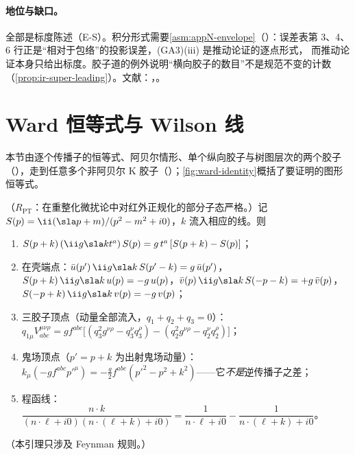 \paragraph{地位与缺口。}全部是标度陈述（E-S）。积分形式需要\cref{asm:appN-envelope}（\tagA）：误差表第 3、4、6 行正是“相对于包络”的投影误差，(GA3)(iii) 是推动论证的逐点形式，
而推动论证本身只给出标度。胶子道的例外说明“横向胶子的数目”不是规范不变的计数（\cref{prop:ir-super-leading}）。文献：\cite[第~11.3~节]{Collins2011}，\cite[第~8~节]{CollinsSoperSterman1989}。

\section{Ward 恒等式与 Wilson 线}\label{sec:method-ward}

本节由逐个传播子的恒等式、阿贝尔情形、单个纵向胶子与树图层次的两个胶子（\tagR），走到任意多个非阿贝尔 K 胶子（\tagA）；\cref{fig:ward-identity}概括了要证明的图形恒等式。

\begin{lemma}\label{lem:method-ward-elementary}
（$R_{\mathrm{PT}}$：在重整化微扰论中对红外正规化的部分子态严格。）记 $S(p)=\ii(\sla p+m)/(p^2-m^2+i0)$，$k$ 流入相应的线。则
\begin{enumerate}[label=(W\arabic*),leftmargin=2.6em,itemsep=1pt,topsep=2pt]
\item $S(p+k)\,(\ii g\sla kt^a)\,S(p)=g\,t^a\,[S(p+k)-S(p)]$；
\item 在壳端点：$\bar u(p')\,\ii g\sla k\,S(p'-k)=g\,\bar u(p')$，$S(p+k)\,\ii g\sla k\,u(p)=-g\,u(p)$，$\bar v(p)\,\ii g\sla k\,S(-p-k)=+g\,\bar v(p)$，$S(-p+k)\,\ii g\sla k\,v(p)=-g\,v(p)$；
\item 三胶子顶点（动量全部流入，$q_1+q_2+q_3=0$）：$q_{1\mu}V^{\mu\nu\rho}_{abc}=gf^{abc}\bigl[(q_3^2g^{\nu\rho}-q_3^\nu q_3^\rho)-(q_2^2g^{\nu\rho}-q_2^\nu q_2^\rho)\bigr]$；
\item 鬼场顶点（$p'=p+k$ 为出射鬼场动量）：$k_\mu(-gf^{abc}p'^\mu)=-\frac g2f^{abc}(p'^2-p^2+k^2)$——它\emph{不是}逆传播子之差；
\item 程函线：$\dfrac{n\cdot k}{(n\cdot\ell+i0)(n\cdot(\ell+k)+i0)}=\dfrac1{n\cdot\ell+i0}-\dfrac1{n\cdot(\ell+k)+i0}$。
\end{enumerate}
（本引理只涉及 Feynman 规则。）
\end{lemma}


